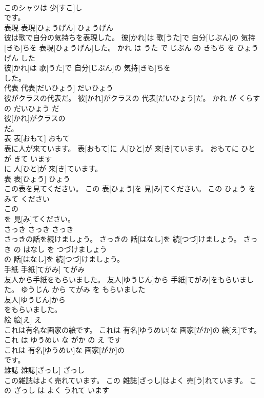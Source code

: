 \documentclass[8pt]{extreport}
\begin{document}
\begin{CJK}{UTF8}{min}
\\	このシャツは 少[すこ]し
\\	です。			
\\	表現	表現[ひょうげん]	ひょうげん	
\\	彼は歌で自分の気持ちを表現した。	彼[かれ]は 歌[うた]で 自分[じぶん]の 気持[きも]ちを 表現[ひょうげん]した。	かれ は うた で じぶん の きもち を ひょうげん した	
\\	彼[かれ]は 歌[うた]で 自分[じぶん]の 気持[きも]ちを
\\	した。			
\\	代表	代表[だいひょう]	だいひょう	
\\	彼がクラスの代表だ。	彼[かれ]がクラスの 代表[だいひょう]だ。	かれ が くらす の だいひょう だ	
\\	彼[かれ]がクラスの
\\	だ。			
\\	表	表[おもて]	おもて	
\\	表に人が来ています。	表[おもて]に 人[ひと]が 来[き]ています。	おもてに ひと が きて います	
\\	に 人[ひと]が 来[き]ています。			
\\	表	表[ひょう]	ひょう	
\\	この表を見てください。	この 表[ひょう]を 見[み]てください。	この ひょう を みて ください	
\\	この
\\	を 見[み]てください。			
\\	さっき	さっき	さっき	
\\	さっきの話を続けましょう。	さっきの 話[はなし]を 続[つづ]けましょう。	さっき の はなし を つづけましょう	
\\	の 話[はなし]を 続[つづ]けましょう。			
\\	手紙	手紙[てがみ]	てがみ	
\\	友人から手紙をもらいました。	友人[ゆうじん]から 手紙[てがみ]をもらいました。	ゆうじん から てがみ を もらいました	
\\	友人[ゆうじん]から
\\	をもらいました。			
\\	絵	絵[え]	え	
\\	これは有名な画家の絵です。	これは 有名[ゆうめい]な 画家[がか]の 絵[え]です。	これ は ゆうめい な がか の え です	
\\	これは 有名[ゆうめい]な 画家[がか]の
\\	です。			
\\	雑誌	雑誌[ざっし]	ざっし	
\\	この雑誌はよく売れています。	この 雑誌[ざっし]はよく 売[う]れています。	この ざっし は よく うれて います	

\end{CJK}
\end{document}
